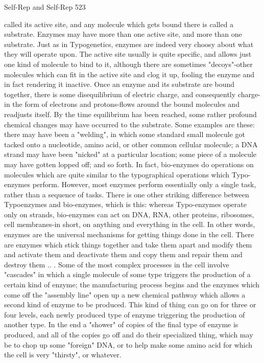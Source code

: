 {Self-Rep and Self-Rep                                                                       523

called its active site, and any molecule which gets bound there is called a substrate. Enzymes
may have more than one active site, and more than one substrate. Just as in Typogenetics,
enzymes are indeed very choosy about what they will operate upon. The active site usually is
quite specific, and allows just one kind of molecule to bind to it, although there are
sometimes "decoys"-other molecules which can fit in the active site and clog it up, fooling
the enzyme and in fact rendering it inactive.
         Once an enzyme and its substrate are bound together, there is some disequilibrium of
electric charge, and consequently charge-in the form of electrons and protons-flows around
the bound molecules and readjusts itself. By the time equilibrium has been reached, some
rather profound chemical changes may have occurred to the substrate. Some examples are
these: there may have been a "welding", in which some standard small molecule got tacked
onto a nucleotide, amino acid, or other common cellular molecule; a DNA strand may have
been "nicked" at a particular location; some piece of a molecule may have gotten lopped off;
and so forth. In fact, bio-enzymes do operations on molecules which are quite similar to the
typographical operations which Typo-enzymes perform. However, most enzymes perform
essentially only a single task, rather than a sequence of tasks. There is one other striking
difference between Typoenzymes and bio-enzymes, which is this: whereas Typo-enzymes
operate only on strands, bio-enzymes can act on DNA, RNA, other proteins, ribosomes, cell
membranes-in short, on anything and everything in the cell. In other words, enzymes are the
universal mechanisms for getting things done in the cell. There are enzymes which stick
things together and take them apart and modify them and activate them and deactivate them
and copy them and repair them and destroy them .. .
         Some of the most complex processes in the cell involve "cascades" in which a single
molecule of some type triggers the production of a certain kind of enzyme; the manufacturing
process begins and the enzymes which come off the "assembly line" open up a new chemical
pathway which allows a second kind of enzyme to be produced. This kind of thing can go on
for three or four levels, each newly produced type of enzyme triggering the production of
another type. In the end a "shower" of copies of the final type of enzyme is produced, and all
of the copies go off and do their specialized thing, which may be to chop up some "foreign"
DNA, or to help make some amino acid for which the cell is very "thirsty", or whatever.


}
